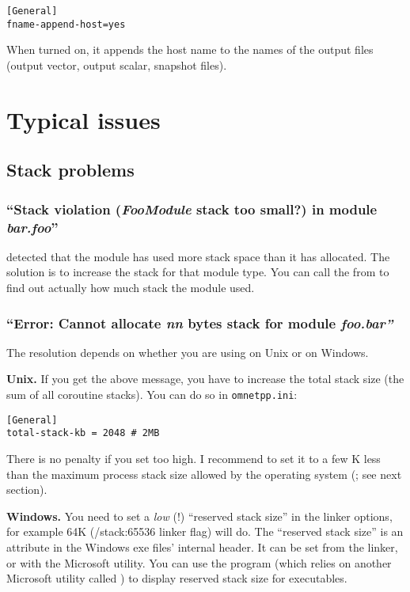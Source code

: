 \begin{verbatim}
[General]
fname-append-host=yes
\end{verbatim}

When turned on, it appends the host name to the names of the output
files (output vector, output scalar, snapshot files).



\section{Typical issues}

\subsection{Stack problems}

\subsubsection{``Stack violation (\textit{FooModule} stack too small?) in module \textit{bar.foo}''}

{\opp} detected that the module has used more stack space than it has
allocated. The solution is to increase the stack for that module type.
You can call the  from  to find out
actually how much stack the module used.


\subsubsection{``Error: Cannot allocate \textit{nn} bytes stack for module \textit{foo.bar''}}

The resolution depends on whether you are using {\opp} on Unix or on Windows.

\textbf{Unix.}
If you get the above message, you have to increase the total stack
size (the sum of all coroutine stacks). You can do
so in \texttt{omnetpp.ini}:

\begin{verbatim}
[General]
total-stack-kb = 2048 # 2MB
\end{verbatim}

There is no penalty if you set  too high. I
recommend to set it to a few K less than the maximum process stack
size allowed by the operating system (; see
next section).


\textbf{Windows.}
You need to set a \textit{low} (!) ``reserved stack size''
in the linker options, for example 64K (/stack:65536 linker flag) will do.
The ``reserved stack size'' is an attribute in the Windows exe
files' internal header. It can be set from the linker, or with
the  Microsoft utility. You can use the 
program (which relies on another Microsoft utility called )
to display reserved stack size for executables.

